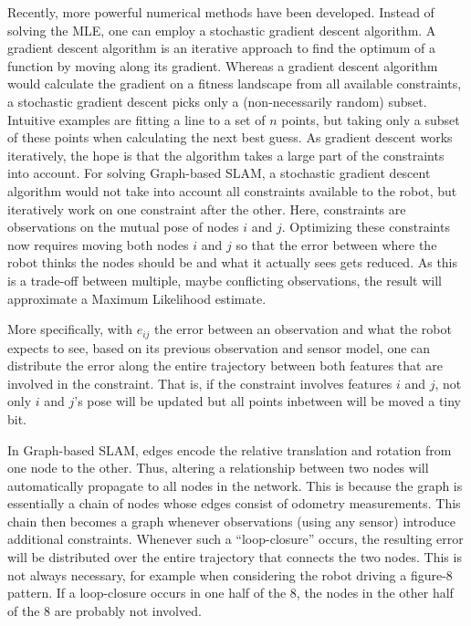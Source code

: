 \documentclass[paper=6.14in:9.21in,pagesize=pdftex,11pt,twoside,openright]{scrbook}
\begin{document}
Recently, more powerful numerical methods have been developed. Instead of solving the MLE, one can employ a stochastic gradient descent algorithm. A gradient descent algorithm is an iterative approach to find the optimum of a function by moving along its gradient. Whereas a gradient descent algorithm would calculate the gradient on a fitness landscape from all available constraints, a stochastic gradient descent picks only a (non-necessarily random) subset. Intuitive examples are fitting a line to a set of $n$ points, but taking only a subset of these points when calculating the next best guess. As gradient descent works iteratively, the hope is that the algorithm takes a large part of the constraints into account. For solving Graph-based SLAM, a stochastic gradient descent algorithm would not take into account all constraints available to the robot, but  iteratively work on one constraint after the other. Here, constraints are observations on the mutual pose of nodes $i$ and $j$. Optimizing these constraints now requires moving both nodes $i$ and $j$ so that the error between where the robot thinks the nodes should be and what it actually sees gets reduced.  As this is a trade-off between multiple, maybe conflicting observations, the result will approximate a Maximum Likelihood estimate.

More specifically, with $ e_{ij}$ the error between an observation and what the robot expects to see, based on its previous observation and sensor model, one can distribute the error along the entire trajectory between both features that are involved in the constraint. That is, if the constraint involves features $i$ and $j$, not only $i$ and $j$'s pose will be updated but all points inbetween will be moved a tiny bit.


In Graph-based SLAM, edges encode the relative translation and rotation from one node to the other. Thus, altering a relationship between two nodes will automatically propagate to all nodes in the network. This is because the graph is essentially a chain of nodes whose edges consist of odometry measurements. This chain then becomes a graph whenever observations (using any sensor) introduce additional constraints. Whenever such a ``loop-closure'' occurs, the resulting error will be distributed over the entire trajectory that connects the two nodes. This is not always necessary, for example when considering the robot driving a figure-8 pattern. If a loop-closure occurs in one half of the 8, the nodes in the other half of the 8 are probably not involved.
\end{document}
